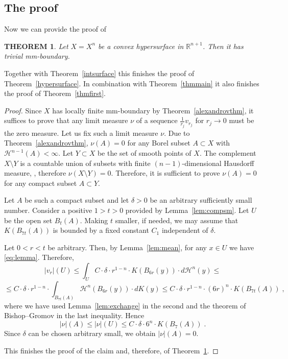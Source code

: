 \documentclass[12pt,leqno]{amsart}
\numberwithin{equation}{section}
\newtheorem{thm}{THEOREM}[section]
\theoremstyle{definition}
\theoremstyle{remark}
\newcommand{\tref}[1]{Theorem~\ref{#1}}
\newcommand{\lref}[1]{Lemma~\ref{#1}}
\newcommand{\R}{\mathbb{R}}
\begin{document}
\subsection{The proof} Now we can provide the proof of
\begin{thm} \label{thmconv}
Let $X=X^n$ be a convex hypersurface in $\R^{n+1}$.  Then it has trivial mm-boundary.

\end{thm}
Together with \tref{intsurface} this finishes the proof of \tref{hypersurface}. In combination with \tref{thmmain} it also finishes the proof of \tref{thmfirst}.
\begin{proof}
 Since $X$ has locally finite mm-boundary by
\tref{alexandrovthm}, it suffices to prove that  any limit measure $\nu$ of a sequence $\frac 1 {r_j} v_{r_j}$ for $r_j\to 0$ must be the zero measure.
Let us fix such a limit measure $\nu$.  Due to \tref{alexandrovthm}, $\nu (A)=0$ for any Borel subset $A\subset X$ with $\mathcal H^{n-1} (A)<\infty$.
Let $Y\subset X$ be the set of smooth points of $X$.
The complement $X\setminus Y$ is a countable union of subsets with finite $(n-1)$-dimensional Hausdorff measure, \cite[Theorem 1.4]{Schneider}, therefore $\nu (X\setminus Y) =0$.   Therefore, it is sufficient to prove $\nu (A)=0$
for any compact subset $A\subset Y$.



Let $A$ be such a compact subset and  let $\delta>0$ be an arbitrary sufficiently small number. Consider a positive $1>t>0$ provided by \lref{lem:compsm}.  Let $U$ be the open set $B_t (A)$. Making $t$ smaller, if needed, we may assume that $K(B_{7t}(A))$ is bounded by a
 fixed constant $C_1$ independent of $\delta$.

 Let $0<r<t$ be arbitrary. Then, by \lref{lem:mean},  for any $x\in U$ we have \eqref{eq:lemma}.
Therefore, $$|v_r| (U)\leq \int _U   C\cdot \delta \cdot r^{1-n}\cdot  K (B_{6r} (y)) \cdot d\mathcal H^n (y) \leq  $$
 $$\leq C\cdot \delta \cdot  r^{1-n} \cdot \int _{B_{7t} (A)} \mathcal H^n (B_{6r} (y)) \cdot dK(y)  \leq C\cdot \delta \cdot  r^{1-n} \cdot (6r) ^n \cdot K(B_{7t} (A)) \;,  $$
where we have used \lref{lem:exchange} in the second and the theorem of Bishop--Gromov in the last inequality.  Hence
$$|\nu| (A) \leq |\nu| (U) \leq C\cdot \delta \cdot 6^n \cdot K(B_7 (A)) \;. $$
Since $\delta$ can be chosen arbitrary small, we obtain $|\nu| (A)=0$.

This finishes the proof of the claim and, therefore, of \tref{thmconv}.
\end{proof}
\end{document}
